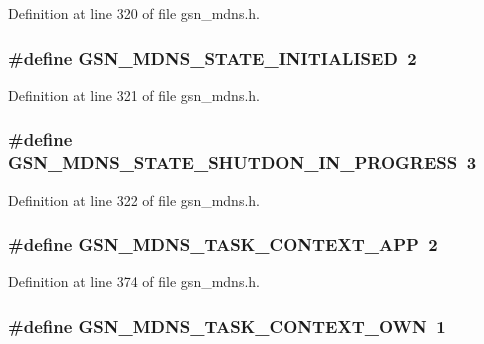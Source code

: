 Definition at line 320 of file gsn\_\-mdns.h.

\hypertarget{a00526_a07057e9e1fc1daab33f89e582e42f436}{
\subsubsection[{GSN\_\-MDNS\_\-STATE\_\-INITIALISED}]{\setlength{\rightskip}{0pt plus 5cm}\#define GSN\_\-MDNS\_\-STATE\_\-INITIALISED~2}}
\label{a00526_a07057e9e1fc1daab33f89e582e42f436}


Definition at line 321 of file gsn\_\-mdns.h.

\hypertarget{a00526_a48c72de96f3fb52e3b3f0b1f8dfd9742}{
\subsubsection[{GSN\_\-MDNS\_\-STATE\_\-SHUTDON\_\-IN\_\-PROGRESS}]{\setlength{\rightskip}{0pt plus 5cm}\#define GSN\_\-MDNS\_\-STATE\_\-SHUTDON\_\-IN\_\-PROGRESS~3}}
\label{a00526_a48c72de96f3fb52e3b3f0b1f8dfd9742}


Definition at line 322 of file gsn\_\-mdns.h.

\hypertarget{a00526_a36f02ee21df2ca0a58dc3f807838f51c}{
\subsubsection[{GSN\_\-MDNS\_\-TASK\_\-CONTEXT\_\-APP}]{\setlength{\rightskip}{0pt plus 5cm}\#define GSN\_\-MDNS\_\-TASK\_\-CONTEXT\_\-APP~2}}
\label{a00526_a36f02ee21df2ca0a58dc3f807838f51c}


Definition at line 374 of file gsn\_\-mdns.h.

\hypertarget{a00526_a0d906077cc369b9de285db34d0e6b822}{
\subsubsection[{GSN\_\-MDNS\_\-TASK\_\-CONTEXT\_\-OWN}]{\setlength{\rightskip}{0pt plus 5cm}\#define GSN\_\-MDNS\_\-TASK\_\-CONTEXT\_\-OWN~1}}
\label{a00526_a0d906077cc369b9de285db34d0e6b822}


